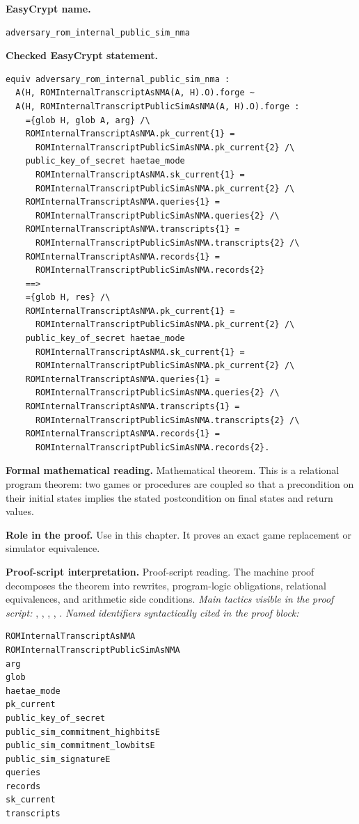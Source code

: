 \begin{formaltheorem}
\noindent\textbf{EasyCrypt name.}
\begin{lstlisting}[language=EasyCrypt,basicstyle=\ttfamily\scriptsize]
adversary_rom_internal_public_sim_nma
\end{lstlisting}
\noindent\textbf{Checked EasyCrypt statement.}
\begin{lstlisting}[language=EasyCrypt,basicstyle=\ttfamily\scriptsize]
equiv adversary_rom_internal_public_sim_nma :
  A(H, ROMInternalTranscriptAsNMA(A, H).O).forge ~
  A(H, ROMInternalTranscriptPublicSimAsNMA(A, H).O).forge :
    ={glob H, glob A, arg} /\
    ROMInternalTranscriptAsNMA.pk_current{1} =
      ROMInternalTranscriptPublicSimAsNMA.pk_current{2} /\
    public_key_of_secret haetae_mode
      ROMInternalTranscriptAsNMA.sk_current{1} =
      ROMInternalTranscriptPublicSimAsNMA.pk_current{2} /\
    ROMInternalTranscriptAsNMA.queries{1} =
      ROMInternalTranscriptPublicSimAsNMA.queries{2} /\
    ROMInternalTranscriptAsNMA.transcripts{1} =
      ROMInternalTranscriptPublicSimAsNMA.transcripts{2} /\
    ROMInternalTranscriptAsNMA.records{1} =
      ROMInternalTranscriptPublicSimAsNMA.records{2}
    ==>
    ={glob H, res} /\
    ROMInternalTranscriptAsNMA.pk_current{1} =
      ROMInternalTranscriptPublicSimAsNMA.pk_current{2} /\
    public_key_of_secret haetae_mode
      ROMInternalTranscriptAsNMA.sk_current{1} =
      ROMInternalTranscriptPublicSimAsNMA.pk_current{2} /\
    ROMInternalTranscriptAsNMA.queries{1} =
      ROMInternalTranscriptPublicSimAsNMA.queries{2} /\
    ROMInternalTranscriptAsNMA.transcripts{1} =
      ROMInternalTranscriptPublicSimAsNMA.transcripts{2} /\
    ROMInternalTranscriptAsNMA.records{1} =
      ROMInternalTranscriptPublicSimAsNMA.records{2}.
\end{lstlisting}
\noindent\textbf{Formal mathematical reading.}
Mathematical theorem. This is a relational program theorem: two games or procedures are coupled so that a precondition on their initial states implies the stated postcondition on final states and return values.

\noindent\textbf{Role in the proof.}
Use in this chapter. It proves an exact game replacement or simulator equivalence.

\noindent\textbf{Proof-script interpretation.}
Proof-script reading. The machine proof decomposes the theorem into rewrites, program-logic obligations, relational equivalences, and arithmetic side conditions.
\emph{Main tactics visible in the proof script:} , , , , .
\emph{Named identifiers syntactically cited in the proof block:}
\begin{lstlisting}[language=EasyCrypt,basicstyle=\ttfamily\scriptsize]
ROMInternalTranscriptAsNMA
ROMInternalTranscriptPublicSimAsNMA
arg
glob
haetae_mode
pk_current
public_key_of_secret
public_sim_commitment_highbitsE
public_sim_commitment_lowbitsE
public_sim_signatureE
queries
records
sk_current
transcripts
\end{lstlisting}

\end{formaltheorem}

